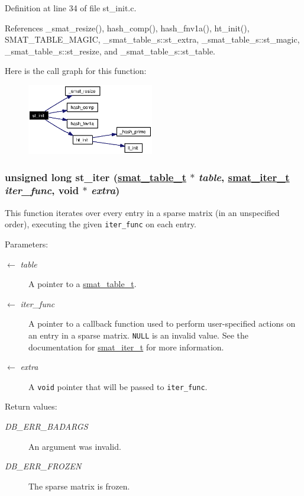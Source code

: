 Definition at line 34 of file st\_\-init.c.

References \_\-smat\_\-resize(), hash\_\-comp(), hash\_\-fnv1a(), ht\_\-init(), SMAT\_\-TABLE\_\-MAGIC, \_\-smat\_\-table\_\-s::st\_\-extra, \_\-smat\_\-table\_\-s::st\_\-magic, \_\-smat\_\-table\_\-s::st\_\-resize, and \_\-smat\_\-table\_\-s::st\_\-table.

Here is the call graph for this function:\begin{figure}[H]
\begin{center}
\leavevmode
\includegraphics[width=157pt]{group__dbprim__smat_ga10_cgraph}
\end{center}
\end{figure}
\hypertarget{group__dbprim__smat_ga14}{
\subsubsection[st\_\-iter]{\setlength{\rightskip}{0pt plus 5cm}unsigned long st\_\-iter (\hyperlink{struct__smat__table__s}{smat\_\-table\_\-t} $\ast$ {\em table}, \hyperlink{group__dbprim__smat_ga4}{smat\_\-iter\_\-t} {\em iter\_\-func}, void $\ast$ {\em extra})}}
\label{group__dbprim__smat_ga14}


This function iterates over every entry in a sparse matrix (in an unspecified order), executing the given {\tt iter\_\-func} on each entry.

\begin{Desc}
\item[Parameters:]
\begin{description}
\item[\mbox{$\leftarrow$} {\em table}]A pointer to a \hyperlink{group__dbprim__smat_ga0}{smat\_\-table\_\-t}. \item[\mbox{$\leftarrow$} {\em iter\_\-func}]A pointer to a callback function used to perform user-specified actions on an entry in a sparse matrix. {\tt NULL} is an invalid value. See the documentation for \hyperlink{group__dbprim__smat_ga4}{smat\_\-iter\_\-t} for more information. \item[\mbox{$\leftarrow$} {\em extra}]A {\tt void} pointer that will be passed to {\tt iter\_\-func}.\end{description}
\end{Desc}
\begin{Desc}
\item[Return values:]
\begin{description}
\item[{\em DB\_\-ERR\_\-BADARGS}]An argument was invalid. \item[{\em DB\_\-ERR\_\-FROZEN}]The sparse matrix is frozen.\end{description}
\end{Desc}


